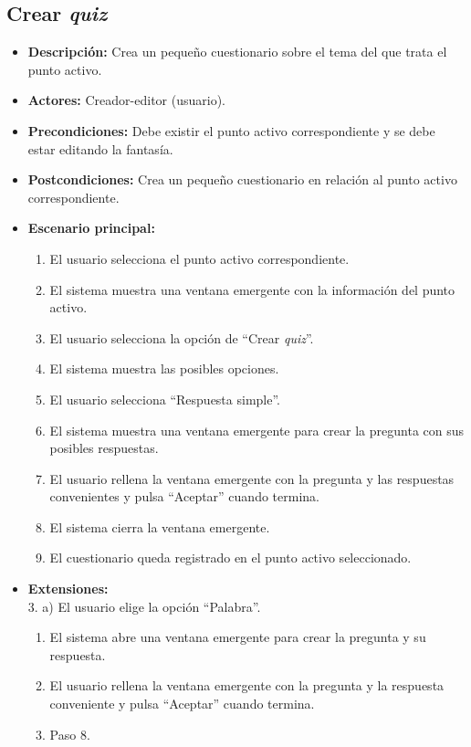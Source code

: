 \subsection{Crear \textit{quiz}}
\begin{itemize}
	\item \textbf{Descripción:} Crea un pequeño cuestionario sobre el tema del que trata el punto activo.
	\item \textbf{Actores:} Creador-editor (usuario).
	\item \textbf{Precondiciones:} Debe existir el punto activo correspondiente y se debe estar editando la fantasía.
	\item \textbf{Postcondiciones:} Crea un pequeño cuestionario en relación al punto activo correspondiente.
	\item \textbf{Escenario principal:}
	\begin{enumerate}
		\item El usuario selecciona el punto activo correspondiente.
		\item El sistema muestra una ventana emergente con la información del punto activo.
		\item El usuario selecciona la opción de ``Crear \textit{quiz}''.
		\item El sistema muestra las posibles opciones.
		\item El usuario selecciona ``Respuesta simple''.
		\item El sistema muestra una ventana emergente para crear la pregunta con sus posibles respuestas.
		\item El usuario rellena la ventana emergente con la pregunta y las respuestas convenientes y pulsa ``Aceptar'' cuando termina.
		\item El sistema cierra la ventana emergente.
		\item El cuestionario queda registrado en el punto activo seleccionado.
	\end{enumerate}
	\item \textbf{Extensiones:} \\3. a) El usuario elige la opción ``Palabra''.
	\begin{enumerate}
		\item El sistema abre una ventana emergente para crear la pregunta y su respuesta.
		\item El usuario rellena la ventana emergente con la pregunta y la respuesta conveniente y pulsa ``Aceptar'' cuando termina.
		\item Paso 8.
	\end{enumerate}

\end{itemize}
